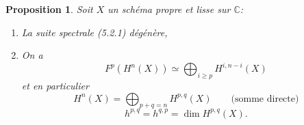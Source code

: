 \documentclass[12pt]{amsart}
\theoremstyle{plain}
\newtheorem{prop}{Proposition}[section]
\theoremstyle{remark}
\begin{document}
\begin{prop}\label{prop:5.3}
Soit $X$ un sch\'ema propre et lisse sur $\mathbb{C}$:
\begin{enumerate}
\item[(i)] La suite spectrale (5.2.1) d\'eg\'en\`ere,
\item[(ii)] On a
\begin{equation}\label{eq:5.3.1}
F^p(H^n(X)) \simeq \bigoplus_{i \geq p} H^{i,n-i}(X)
\end{equation}
et en particulier
\begin{equation}\label{eq:5.3.2}
H^n(X) = \bigoplus_{p+q=n} H^{p,q}(X) \qquad \text{(somme directe)}
\end{equation}
\begin{equation}\label{eq:5.3.3}
h^{p,q} = h^{q,p} = \dim H^{p,q}(X).
\end{equation}
\end{enumerate}
\end{prop}
\end{document}

